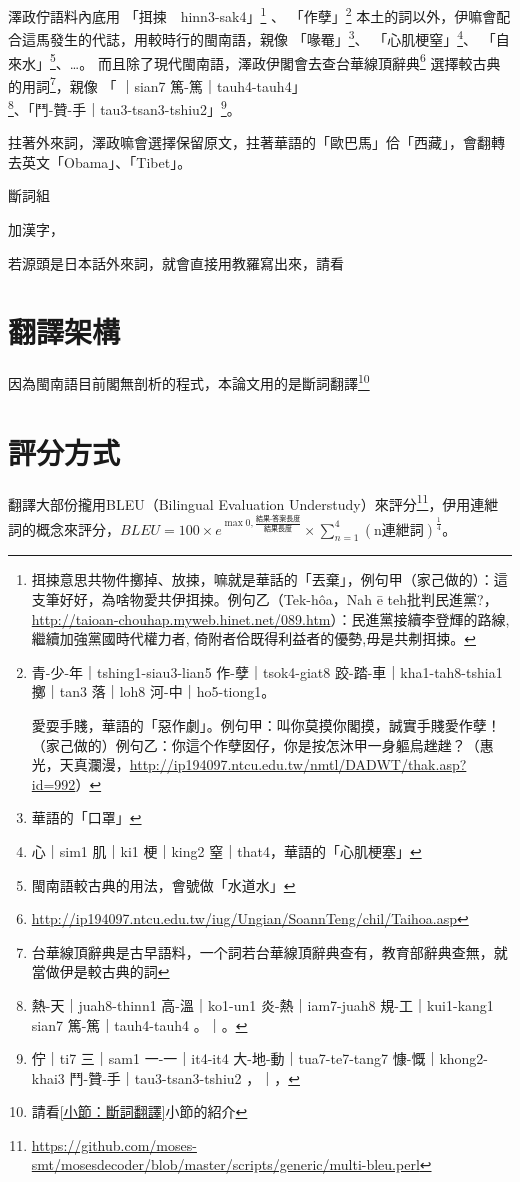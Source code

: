 \documentclass[final,oneside,onecolumn,12pt,a4paper]{book}%
\begin{document}
澤政佇語料內底用
「挕捒　hinn3-sak4」\footnote{挕捒意思共物件擲掉、放捒，嘛就是華話的「丟棄」，例句甲（家己做的）：這支筆好好，為啥物愛共伊挕捒。例句乙（Tek-hôa，Nah ē teh批判民進黨?，\url{http://taioan-chouhap.myweb.hinet.net/089.htm}）：民進黨接續李登輝的路線, 繼續加強黨國時代權力者, 倚附者佮既得利益者的優勢,毋是共刜挕捒。}
、
「作孽」\footnote{
青-少-年｜tshing1-siau3-lian5 作-孽｜tsok4-giat8 跤-踏-車｜kha1-tah8-tshia1 擲｜tan3 落｜loh8 河-中｜ho5-tiong1。

愛耍手賤，華語的「惡作劇」。例句甲：叫你莫摸你閣摸，誠實手賤愛作孽！（家己做的）例句乙：你這个作孽囡仔，你是按怎沐甲一身軀烏趖趖？（惠光，天真瀾漫，\url{http://ip194097.ntcu.edu.tw/nmtl/DADWT/thak.asp?id=992}）}
本土的詞以外，伊嘛會配合這馬發生的代誌，用較時行的閩南語，親像
「喙罨」\footnote{華語的「口罩」}、
「心肌梗窒」\footnote{心｜sim1 肌｜ki1 梗｜king2 窒｜that4，華語的「心肌梗塞」}、
「自來水」\footnote{閩南語較古典的用法，會號做「水道水」}、…。
而且除了現代閩南語，澤政伊閣會去查台華線頂辭典\footnote{\url{http://ip194097.ntcu.edu.tw/iug/Ungian/SoannTeng/chil/Taihoa.asp}}
選擇較古典的用詞\footnote{台華線頂辭典是古早語料，一个詞若台華線頂辭典查有，教育部辭典查無，就當做伊是較古典的詞}，親像
「𤺪｜sian7 篤-篤｜tauh4-tauh4」\footnote{熱-天｜juah8-thinn1 高-溫｜ko1-un1 炎-熱｜iam7-juah8 規-工｜kui1-kang1 𤺪｜sian7 篤-篤｜tauh4-tauh4 。｜。}、「鬥-贊-手｜tau3-tsan3-tshiu2」\footnote{佇｜ti7 三｜sam1 一-一｜it4-it4 大-地-動｜tua7-te7-tang7 慷-慨｜khong2-khai3 鬥-贊-手｜tau3-tsan3-tshiu2 ，｜，}。

拄著外來詞，澤政嘛會選擇保留原文，拄著華語的「歐巴馬」佮「西藏」，會翻轉去英文「Obama」、「Tibet」。

斷詞組

加漢字，

若源頭是日本話外來詞，就會直接用教羅寫出來，請看

\section{翻譯架構}
\label{節：翻譯架構}
因為閩南語目前閣無剖析的程式，本論文用的是斷詞翻譯\footnote{請看\ref{小節：斷詞翻譯}小節的紹介}
\section{評分方式}
\label{節：評分方式}

翻譯大部份攏用BLEU（Bilingual Evaluation Understudy）來評分\footnote{\url{https://github.com/moses-smt/mosesdecoder/blob/master/scripts/generic/multi-bleu.perl}}，伊用連紲詞的概念來評分，$BLEU=100\times{e^{\max{0,\frac{\textit{結果-答案長度}}{\textit{結果長度}}}}}\times{\sum_{n=1}^{4}(\textrm{n連紲詞})^{\frac{1}{4}}}$。
\end{document}
